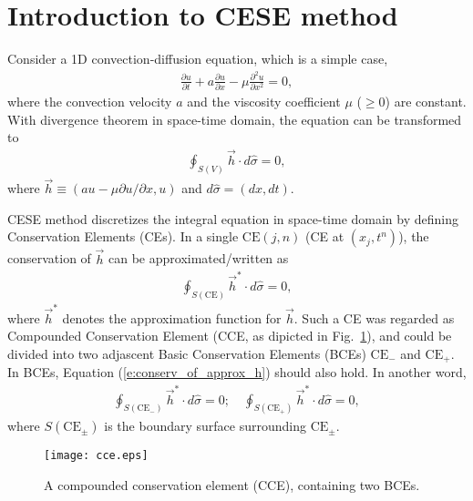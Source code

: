 \documentclass[11pt,dvips]{article}
\renewcommand{\figurename}{Fig.}
\numberwithin{equation}{section}
\begin{document}
\section{Introduction to CESE method}
\label{s:cese_intro}

Consider a 1D convection-diffusion equation, which is a simple case,
\begin{align}
    \frac{\partial u}{\partial t} + a\frac{\partial u}{\partial x}
  - \mu\frac{\partial^2u}{\partial x^2} = 0, \label{e:conv_diff_govern}
\end{align}
where the convection velocity $a$ and the viscosity coefficient $\mu$ ($\ge0$)
are constant.  With divergence theorem in space-time domain, the equation can
be transformed to
\begin{align}
  \oint_{S(V)}\vec{h}\cdot d\hat{\sigma}=0, \label{e:conservation}
\end{align}
where $\vec{h}\equiv(au-\mu\partial u/\partial x,u)$ and $d\hat{\sigma}=(dx,
dt)$.

CESE method discretizes the integral equation in space-time domain by
defining Conservation Elements (CEs).  In a single $\mathrm{CE}(j,n)$ (CE at
$(x_j,t^n)$), the conservation of $\vec{h}$ can be approximated/written as
\begin{align}
  \oint_{S(\mathrm{CE})}\vec{h}^*\cdot d\hat{\sigma} = 0,
    \label{e:conserv_of_approx_h}
\end{align}
where $\vec{h}^*$ denotes the approximation function for $\vec{h}$.  Such a CE
was regarded as Compounded Conservation Element (CCE, as dipicted in
\figurename~\ref{f:cce}), and could be divided into two adjascent Basic
Conservation Elements (BCEs) $\mathrm{CE}_-$ and $\mathrm{CE}_+$.  In BCEs,
Equation (\ref{e:conserv_of_approx_h}) should also hold.  In another word,
\begin{align*}
  \oint_{S(\mathrm{CE}_-)}\vec{h}^*\cdot d\hat{\sigma} = 0; \quad
  \oint_{S(\mathrm{CE}_+)}\vec{h}^*\cdot d\hat{\sigma} = 0,
\end{align*}
where $S(\mathrm{CE}_{\pm})$ is the boundary surface surrounding
$\mathrm{CE}_{\pm}$.

\begin{figure}[htbp]
\centering
  \texttt{[image: cce.eps]}
  \caption{A compounded conservation element (CCE), containing two BCEs.}
  \label{f:cce}
\end{figure}
\end{document}
